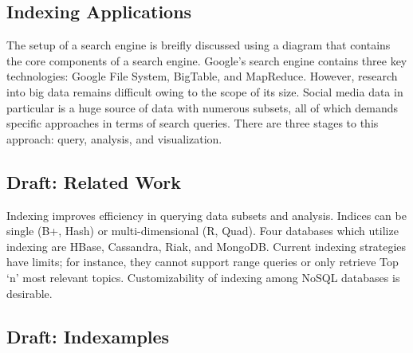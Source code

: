 
\subsection{Indexing Applications}

The setup of a search engine is breifly discussed using a diagram that
contains the core components of a search engine. Google's search engine
contains three key technologies: Google File System, BigTable, and
MapReduce. However, research into big data remains difficult owing to
the scope of its size. Social media data in particular is a huge source
of data with numerous subsets, all of which demands specific approaches
in terms of search queries. There are three stages to this approach:
query, analysis, and visualization.




\subsection{Draft: Related Work}

Indexing improves efficiency in querying data subsets and analysis.
Indices can be single (B+, Hash) or multi-dimensional (R, Quad). Four
databases which utilize indexing are HBase, Cassandra, Riak, and
MongoDB. Current indexing strategies have limits; for instance, they
cannot support range queries or only retrieve Top `n' most relevant
topics. Customizability of indexing among NoSQL databases is desirable.




\subsection{Draft: Indexamples}

